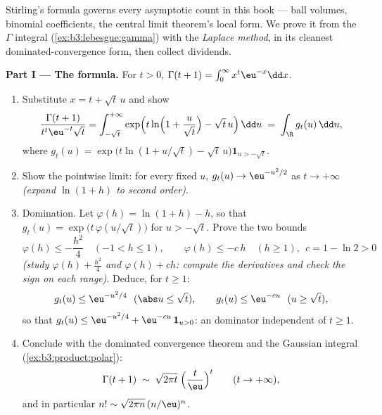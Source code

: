 \begin{problem}
\label{pb:b3:product:1}
Stirling's formula governs every asymptotic count in this book
--- ball volumes, binomial coefficients, the central limit
theorem's local form. We prove it from the $\Gamma$ integral
(\cref{ex:b3:lebesgue:gamma}) with the \emph{Laplace method},
in its cleanest dominated-convergence form, then collect
dividends.

\medskip
\noindent\textbf{Part I --- The formula.} For $t > 0$,
$\Gamma(t + 1) = \int_0^\infty x^{t}\eu^{-x}\dd x$.
\begin{enumerate}
  \item Substitute $x = t + \sqrt t\,u$ and show
        \[
        \frac{\Gamma(t+1)}{t^{t}\eu^{-t}\sqrt t}
        = \int_{-\sqrt t}^{+\infty}
        \exp\Bigl(t\ln\Bigl(1 + \frac u{\sqrt
        t}\Bigr) - \sqrt t\,u\Bigr)\,\dd u
        \;=\;\int_\R g_t(u)\,\dd u,
        \]
        where $g_t(u) = \exp\bigl(t\ln(1 + u/\sqrt t) -
        \sqrt t\,u\bigr)\mathbf 1_{u > -\sqrt t}$.
  \item Show the pointwise limit: for every fixed $u$, $g_t(u)
        \to \eu^{-u^2/2}$ as $t \to +\infty$ \emph{(expand
        $\ln(1 + h)$ to second order)}.
  \item Domination. Let $\varphi(h) = \ln(1 + h) - h$, so that
        $g_t(u) = \exp\bigl(t\,\varphi(u/\sqrt t)\bigr)$ for
        $u > -\sqrt t$. Prove the two bounds
        \[
        \varphi(h) \leq -\frac{h^2}4 \quad (-1 < h \leq 1),
        \qquad
        \varphi(h) \leq -c\,h \quad (h \geq 1),\ \ c = 1 -
        \ln 2 > 0
        \]
        \emph{(study $\varphi(h) + \frac{h^2}4$ and $\varphi(h)
        + ch$: compute the derivatives and check the sign on
        each range)}. Deduce, for $t \geq 1$:
        \[
        g_t(u) \leq \eu^{-u^2/4}\ \ (\abs u \leq \sqrt t),
        \qquad
        g_t(u) \leq \eu^{-cu}\ \ (u \geq \sqrt t),
        \]
        so that $g_t(u) \leq \eu^{-u^2/4} +
        \eu^{-cu}\,\mathbf 1_{u > 0}$: an  dominator
        independent of $t \geq 1$.
  \item Conclude with the dominated convergence theorem and the
        Gaussian integral (\cref{ex:b3:product:polar}):
        \[
        \Gamma(t + 1) \;\sim\;
        \sqrt{2\pi t}\;\Bigl(\frac t\eu\Bigr)^{t}
        \qquad (t \to +\infty),
        \]
        and in particular $n! \sim \sqrt{2\pi
        n}\,(n/\eu)^n$.
\end{enumerate}


\end{problem}
